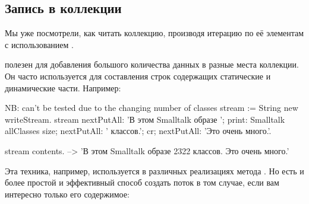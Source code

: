 \documentclass[a4paper,10pt,twoside]{book}
\begin{document}
\subsection{Запись в коллекции}

Мы уже посмотрели, как читать коллекцию, производя итерацию по её элементам с использованием .

 полезен для добавления большого количества данных в разные места коллекции. Он часто используется для составления строк содержащих статические и динамические части. Например:

\begin{code}{NB: can't be tested due to the changing number of classes}
stream := String new writeStream.
stream
  nextPutAll: 'В этом Smalltalk образе ';
  print: Smalltalk allClasses size;
  nextPutAll: ' классов.';
  cr;
  nextPutAll: 'Это очень много.'.

stream contents. --> 'В этом Smalltalk образе 2322 классов.
Это очень много.'
\end{code}

Эта техника, например, используется в различных реализациях метода . Но есть и более простой и эффективный способ создать поток в том случае, если вам интересно только его содержимое:

\end{document}
